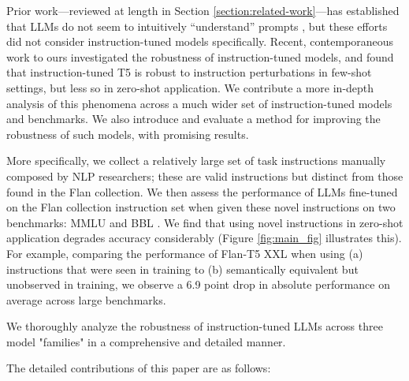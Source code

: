 


Prior work---reviewed at length in Section \ref{section:related-work}---has established that LLMs do not seem to intuitively ``understand'' prompts \cite{webson2021prompt,jang2023can, zhang2023aligning}, but these efforts did not consider instruction-tuned models specifically.
Recent, contemporaneous work to ours \cite{gu2023robustness} investigated the robustness of instruction-tuned models, and found that instruction-tuned T5 \cite{raffel2020exploring} is robust to instruction perturbations in few-shot settings, but less so in zero-shot application.
We contribute a more in-depth analysis of this phenomena across a much wider set of instruction-tuned models and benchmarks.
We also introduce and evaluate a method for improving the robustness of such models, with promising results.

More specifically, we collect a relatively large set of task instructions manually composed by NLP researchers; these are valid instructions but distinct from those found in the Flan collection.
We then assess the performance of LLMs fine-tuned on the Flan collection instruction set when given these novel instructions on two benchmarks: \textsc{MMLU} \cite{hendrycks2020measuring} and \textsc{BBL} \cite{srivastava2022beyond}.
We find that using novel instructions in zero-shot application degrades accuracy considerably (Figure \ref{fig:main_fig} illustrates this).
For example, comparing the performance of Flan-T5 XXL when using (a) instructions that were seen in training to (b) semantically equivalent but unobserved in training, we observe a 6.9 point drop in absolute performance on average across large benchmarks.

We thoroughly analyze the robustness of instruction-tuned LLMs across three model "families" in a comprehensive and detailed manner.

The detailed contributions of this paper are as follows:


